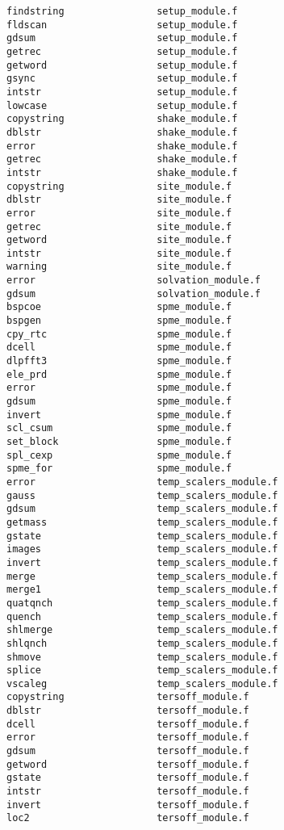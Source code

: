 \begin{verbatim}
findstring                setup_module.f
fldscan                   setup_module.f
gdsum                     setup_module.f
getrec                    setup_module.f
getword                   setup_module.f
gsync                     setup_module.f
intstr                    setup_module.f
lowcase                   setup_module.f
copystring                shake_module.f
dblstr                    shake_module.f
error                     shake_module.f
getrec                    shake_module.f
intstr                    shake_module.f
copystring                site_module.f
dblstr                    site_module.f
error                     site_module.f
getrec                    site_module.f
getword                   site_module.f
intstr                    site_module.f
warning                   site_module.f
error                     solvation_module.f
gdsum                     solvation_module.f
bspcoe                    spme_module.f
bspgen                    spme_module.f
cpy_rtc                   spme_module.f
dcell                     spme_module.f
dlpfft3                   spme_module.f
ele_prd                   spme_module.f
error                     spme_module.f
gdsum                     spme_module.f
invert                    spme_module.f
scl_csum                  spme_module.f
set_block                 spme_module.f
spl_cexp                  spme_module.f
spme_for                  spme_module.f
error                     temp_scalers_module.f
gauss                     temp_scalers_module.f
gdsum                     temp_scalers_module.f
getmass                   temp_scalers_module.f
gstate                    temp_scalers_module.f
images                    temp_scalers_module.f
invert                    temp_scalers_module.f
merge                     temp_scalers_module.f
merge1                    temp_scalers_module.f
quatqnch                  temp_scalers_module.f
quench                    temp_scalers_module.f
shlmerge                  temp_scalers_module.f
shlqnch                   temp_scalers_module.f
shmove                    temp_scalers_module.f
splice                    temp_scalers_module.f
vscaleg                   temp_scalers_module.f
copystring                tersoff_module.f
dblstr                    tersoff_module.f
dcell                     tersoff_module.f
error                     tersoff_module.f
gdsum                     tersoff_module.f
getword                   tersoff_module.f
gstate                    tersoff_module.f
intstr                    tersoff_module.f
invert                    tersoff_module.f
loc2                      tersoff_module.f

\end{verbatim}
